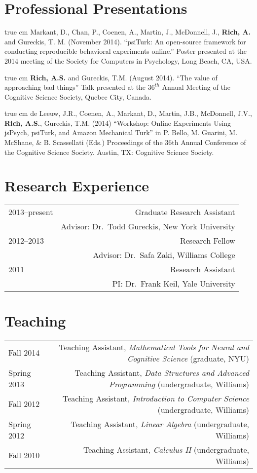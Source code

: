 \documentclass[12pt]{my_cv}
\def\ind{\hangindent=1 true cm\hangafter=1 \noindent}
\begin{document}
\section{Professional Presentations}
\ind Markant, D., Chan, P., Coenen, A., Martin, J., McDonnell, J., \textbf{Rich, A.} and Gureckis, T. M. (November 2014). ``psiTurk: An open-source framework for conducting reproducible behavioral experiments online.'' Poster presented at the 2014 meeting of the Society for Computers in Psychology, Long Beach, CA, USA.

\ind \textbf{Rich, A.S.} and Gureckis, T.M. (August 2014). ``The value of approaching bad things'' Talk presented at the $36^{th}$ Annual Meeting of the Cognitive Science Society, Quebec City, Canada.

\ind de Leeuw, J.R., Coenen, A., Markant, D., Martin, J.B., McDonnell, J.V., \textbf{Rich, A.S.}, Gureckis, T.M. (2014) ``Workshop: Online Experiments Using jsPsych, psiTurk, and Amazon Mechanical Turk'' in P. Bello, M. Guarini, M. McShane, \& B. Scassellati (Eds.) Proceedings of the 36th Annual Conference of the Cognitive Science Society. Austin, TX: Cognitive Science Society.	

\section{Research Experience}
\begin{tabular}{L R}
2013--present& Graduate Research Assistant\\
&Advisor: Dr.\ Todd Gureckis, New York University\\[1ex]
2012--2013& Research Fellow\\
&Advisor: Dr.\ Safa Zaki, Williams College\\[1ex]
2011&Research Assistant\\
&PI: Dr.\ Frank Keil, Yale University\\
\end{tabular}

\section{Teaching}
\begin{tabular}{L R}
Fall 2014&Teaching Assistant, \emph{Mathematical Tools for Neural and Cognitive Science} (graduate, NYU)\\ [0.5ex]
Spring 2013&Teaching Assistant, \emph{Data Structures and Advanced Programming} (undergraduate, Williams)\\[0.5ex]
Fall 2012&Teaching Assistant, \emph{Introduction to Computer Science} (undergraduate, Williams)\\[0.5ex]
Spring 2012&Teaching Assistant, \emph{Linear Algebra} (undergraduate, Williams)\\[0.5ex]
Fall 2010&Teaching Assistant, \emph{Calculus II} (undergraduate, Williams)\\[0.5ex]
\end{tabular}
\end{document}
